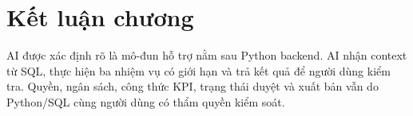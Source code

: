 \section{Kết luận chương}

AI được xác định rõ là mô-đun hỗ trợ nằm sau Python backend. AI nhận context từ SQL, thực hiện ba nhiệm vụ có giới hạn và trả kết quả để người dùng kiểm tra. Quyền, ngân sách, công thức KPI, trạng thái duyệt và xuất bản vẫn do Python/SQL cùng người dùng có thẩm quyền kiểm soát.
